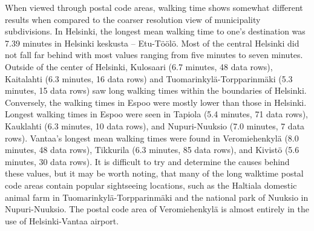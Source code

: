 When viewed through postal code areas, walking time shows somewhat different results when compared to the coarser resolution view of municipality subdivisions. In Helsinki, the longest mean walking time to one's destination was 7.39 minutes in Helsinki keskusta -- Etu-Töölö. Most of the central Helsinki did not fall far behind with most values ranging from five minutes to seven minutes. Outside of the center of Helsinki, Kulosaari (6.7 minutes, 48 data rows), Kaitalahti (6.3 minutes, 16 data rows) and Tuomarinkylä-Torpparinmäki (5.3 minutes, 15 data rows) saw long walking times within the boundaries of Helsinki. Conversely, the walking times in Espoo were mostly lower than those in Helsinki. Longest walking times in Espoo were seen in Tapiola (5.4 minutes, 71 data rows), Kauklahti (6.3 minutes, 10 data rows), and Nupuri-Nuuksio (7.0 minutes, 7 data rows). Vantaa's longest mean walking times were found in Veromiehenkylä (8.0 minutes, 48 data rows), Tikkurila (6.3 minutes, 85 data rows), and Kivistö (5.6 minutes, 30 data rows). It is difficult to try and determine the causes behind these values, but it may be worth noting, that many of the long walktime postal code areas contain popular sightseeing locations, such as the Haltiala domestic animal farm in Tuomarinkylä-Torpparinmäki and the national park of Nuuksio in Nupuri-Nuuksio. The postal code area of Veromiehenkylä is almost entirely in the use of Helsinki-Vantaa airport.




